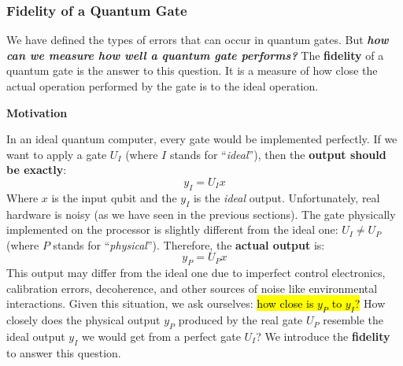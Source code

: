 \subsubsection{Fidelity of a Quantum Gate}\label{sec:fidelity-of-a-quantum-gate}

We have defined the types of errors that can occur in quantum gates. But \textbf{\emph{how can we measure how well a quantum gate performs?}} The \textbf{fidelity} of a quantum gate is the answer to this question. It is a measure of how close the actual operation performed by the gate is to the ideal operation.

\highspace
\begin{flushleft}
    \textcolor{Green3}{ \textbf{Motivation}}
\end{flushleft}
In an ideal quantum computer, every gate would be implemented perfectly. If we want to apply a gate $U_I$ (where $I$ stands for ``\emph{ideal}''), then the \textbf{output should be exactly}:
\begin{equation}\label{eq:ideal-output}
    y_I = U_I x
\end{equation}
Where $x$ is the input qubit and the $y_I$ is the \emph{ideal} output. Unfortunately, real hardware is noisy (as we have seen in the previous sections). The gate physically implemented on the processor is slightly different from the ideal one: $U_I \neq U_P$ (where $P$ stands for ``\emph{physical}''). Therefore, the \textbf{actual output} is:
\begin{equation}\label{eq:actual-output}
    y_P = U_P x
\end{equation}
This output may differ from the ideal one due to imperfect control electronics, calibration errors, decoherence, and other sources of noise like environmental interactions. Given this situation, we ask ourselves: \hl{how close is $y_P$ to $y_I$?} How closely does the physical output $y_P$ produced by the real gate $U_P$ resemble the ideal output $y_I$ we would get from a perfect gate $U_I$? We introduce the \textbf{fidelity} to answer this question.

